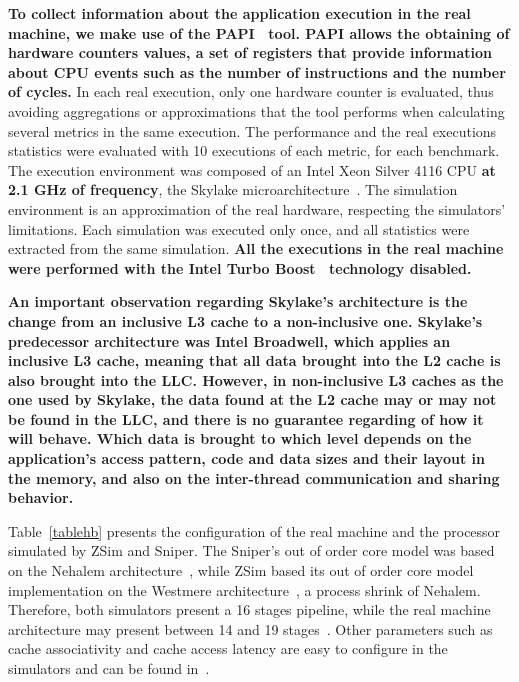 \documentclass[AMA,final,STIX1COL]{WileyNJD-v2}
\newcommand{\ms}[1]{\textcolor{orange}{\bfseries \ul{ msserpa: #1} }\vspace{0.2cm}}
\begin{document}
\textbf{To collect information about the application execution in the real machine, we make use of the PAPI~\cite{terpstra2010papi} tool.
PAPI allows the obtaining of hardware counters values, a set of registers that provide information about CPU events such as the number of instructions and the number of cycles.}
In each real execution, only one hardware counter is evaluated, thus avoiding aggregations or approximations that the tool performs when calculating several metrics in the same execution.
The performance and the real executions statistics were evaluated with 10 executions of each metric, for each benchmark.
The execution environment was composed of an Intel Xeon Silver 4116 CPU \textbf{at 2.1 GHz of frequency}, the Skylake microarchitecture~\cite{doweck2017skylake}.
The simulation environment is an approximation of the real hardware, respecting the simulators' limitations.
Each simulation was executed only once, and all statistics were extracted from the same simulation.
\textbf{All the executions in the real machine were performed with the Intel Turbo Boost~\cite{rotem2012turbo} technology disabled.}

\textbf{An important observation regarding Skylake's architecture is the change from an inclusive L3 cache to a non-inclusive one.
Skylake's predecessor architecture was Intel Broadwell, which applies an inclusive L3 cache, meaning that all data brought into the L2 cache is also brought into the LLC.
However, in non-inclusive L3 caches as the one used by Skylake, the data found at the L2 cache may or may not be found in the LLC, and there is no guarantee regarding of how it will behave.
Which data is brought to which level depends on the application's access pattern, code and data sizes and their layout in the memory, and also on the inter-thread communication and sharing behavior.
}


Table~\ref{tablehb}  presents the configuration of the real machine and the processor simulated by ZSim and Sniper. 
The Sniper's out of order core model was based on the Nehalem architecture~\cite{carlson2011sniper}, while ZSim based its out of order core model implementation on the Westmere architecture~\cite{sanchez2013zsim}, a process shrink of Nehalem.
Therefore, both simulators present a 16 stages pipeline, while the real machine architecture may present between 14 and 19 stages~\cite{fog2012microarchitecture}.
Other parameters such as cache associativity and cache access latency are easy to configure in the simulators and can be found in~\cite{fog2012microarchitecture,doweck2017skylake}.
\end{document}
